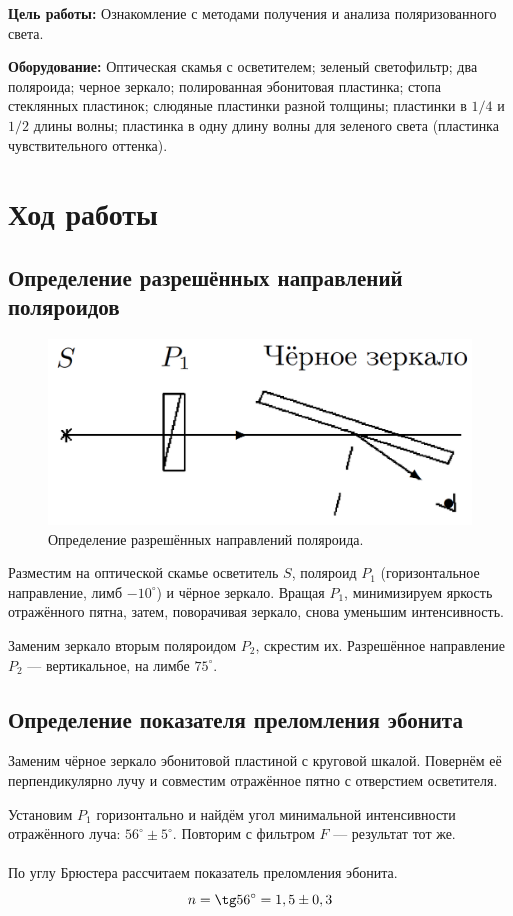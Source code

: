 
\textbf{Цель работы:} Ознакомление с методами получения и анализа поляризованного света.

\textbf{Оборудование:} Оптическая скамья с осветителем; зеленый светофильтр; два поляроида; черное зеркало; полированная эбонитовая пластинка; стопа стеклянных пластинок; слюдяные пластинки разной толщины; пластинки в $ 1/4 $ и $ 1/2 $ длины волны; пластинка в одну длину волны для зеленого света (пластинка чувствительного оттенка).

\section*{Ход работы}

\subsection*{Определение разрешённых направлений поляроидов}
\begin{figure}[h]
    \centering
	\includegraphics[width=0.5\linewidth]{images/Screenshot_1.png}
	\caption{Определение разрешённых направлений поляроида.}
	\label{pic:1}
\end{figure}
Разместим на оптической скамье осветитель $ S $, поляроид $ P_1 $ (горизонтальное направление, лимб $-10^\circ$) и чёрное зеркало. Вращая $ P_1 $, минимизируем яркость отражённого пятна, затем, поворачивая зеркало, снова уменьшим интенсивность.  

Заменим зеркало вторым поляроидом $ P_2 $, скрестим их. Разрешённое направление $ P_2 $ — вертикальное, на лимбе $ 75^\circ $.

\subsection*{Определение показателя преломления эбонита}
Заменим чёрное зеркало эбонитовой пластиной с круговой шкалой. Повернём её перпендикулярно лучу и совместим отражённое пятно с отверстием осветителя.  

Установим $ P_1 $ горизонтально и найдём угол минимальной интенсивности отражённого луча: $ 56^\circ \pm 5^\circ $. Повторим с фильтром $ F $ — результат тот же.
\\\\
По углу Брюстера рассчитаем показатель преломления эбонита.
\begin{equation}\label{eq:1}
	n = \tg 56^{\circ} = 1,5 \pm 0,3
\end{equation}

